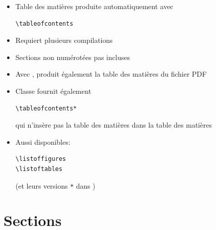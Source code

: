 \begin{itemize}
\item Table des matières produite automatiquement avec
\begin{lstlisting}
\tableofcontents
\end{lstlisting}
\item Requiert plusieurs compilations
\item Sections non numérotées pas incluses
\item Avec , produit également la table des matières du
  fichier PDF
\item Classe  fournit également
\begin{lstlisting}
\tableofcontents*
\end{lstlisting}
  qui n'insère pas la table des matières dans la table des matières
\item Aussi disponibles:
\begin{lstlisting}
\listoffigures
\listoftables
\end{lstlisting}
  (et leurs versions \verb=*= dans )
\end{itemize}


\section{Sections}

